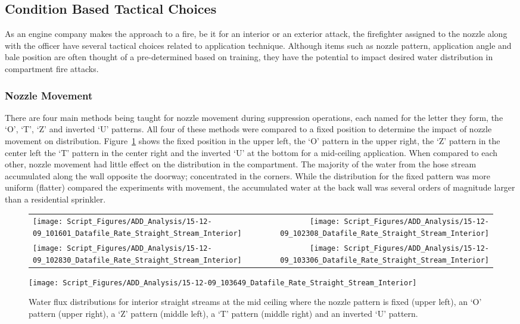 \documentclass[12pt,oneside]{book}
\begin{document}
\clearpage

\subsection{Condition Based Tactical Choices}
As an engine company makes the approach to a fire, be it for an interior or an exterior attack, the firefighter assigned to the nozzle along with the officer have several tactical choices related to application technique. Although items such as nozzle pattern, application angle and bale position are often thought of a pre-determined based on training, they have the potential to impact desired water distribution in compartment fire attacks. 

\subsubsection{Nozzle Movement}
There are four main methods being taught for nozzle movement during suppression operations, each named for the letter they form, the `O', `T', `Z' and inverted `U' patterns. All four of these methods were compared to a fixed position to determine the impact of nozzle movement on distribution. Figure~\ref{fig:Nozzle Movements Example, First Floor Interior} shows the fixed position in the upper left, the `O' pattern in the upper right, the `Z' pattern in the center left the `T' pattern in the center right and the inverted `U' at the bottom for a mid-ceiling application. When compared to each other, nozzle movement had little effect on the distribution in the compartment. The majority of the water from the hose stream accumulated along the wall opposite the doorway; concentrated in the corners. While the distribution for the fixed pattern was more uniform (flatter) compared the experiments with movement, the accumulated water at the back wall was several orders of magnitude larger than a residential sprinkler. 

\begin{figure}[ht]
\begin{tabular*}{\textwidth}{lr}
\texttt{[image: Script\_Figures/ADD\_Analysis/15-12-09\_101601\_Datafile\_Rate\_Straight\_Stream\_Interior]} &
\texttt{[image: Script\_Figures/ADD\_Analysis/15-12-09\_102308\_Datafile\_Rate\_Straight\_Stream\_Interior]} \\
\texttt{[image: Script\_Figures/ADD\_Analysis/15-12-09\_102830\_Datafile\_Rate\_Straight\_Stream\_Interior]} &
\texttt{[image: Script\_Figures/ADD\_Analysis/15-12-09\_103306\_Datafile\_Rate\_Straight\_Stream\_Interior]} \\
\end{tabular*}
\centering
\texttt{[image: Script\_Figures/ADD\_Analysis/15-12-09\_103649\_Datafile\_Rate\_Straight\_Stream\_Interior]}
\caption[Straight Stream Varied Nozzle Movements, First Floor Interior]{Water flux distributions for interior straight streams at the mid ceiling where the nozzle pattern is fixed (upper left), an `O' pattern (upper right), a `Z' pattern (middle left), a `T' pattern (middle right) and an inverted `U' pattern. }
\label{fig:Nozzle Movements Example, First Floor Interior}
\end{figure}
\end{document}
